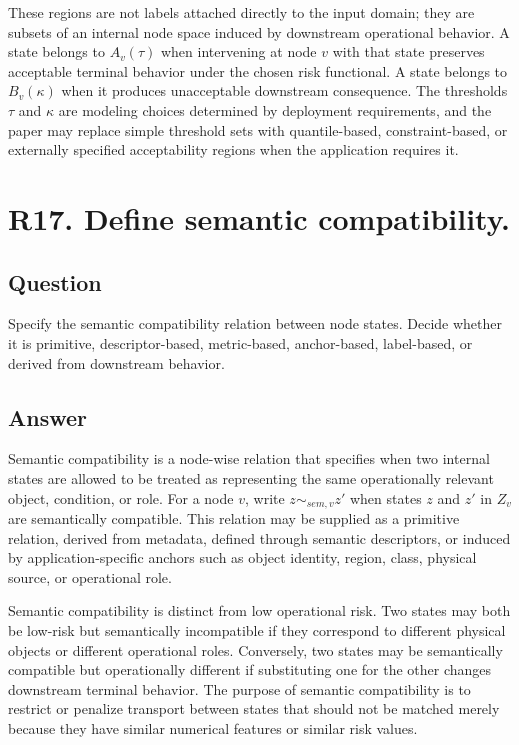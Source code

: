 \documentclass[11pt,a4paper]{article}
\begin{document}
These regions are not labels attached directly to the input domain; they are subsets of an internal node space induced by downstream operational behavior. A state belongs to \(A_v(\tau)\) when intervening at node \(v\) with that state preserves acceptable terminal behavior under the chosen risk functional. A state belongs to \(B_v(\kappa)\) when it produces unacceptable downstream consequence. The thresholds \(\tau\) and \(\kappa\) are modeling choices determined by deployment requirements, and the paper may replace simple threshold sets with quantile-based, constraint-based, or externally specified acceptability regions when the application requires it.

\section*{R17. Define semantic compatibility.}

\subsection*{Question}

Specify the semantic compatibility relation between node states. Decide whether it is primitive, descriptor-based, metric-based, anchor-based, label-based, or derived from downstream behavior.

\subsection*{Answer}

Semantic compatibility is a node-wise relation that specifies when two internal states are allowed to be treated as representing the same operationally relevant object, condition, or role. For a node \(v\), write \(z \sim_{sem,v} z'\) when states \(z\) and \(z'\) in \(Z_v\) are semantically compatible. This relation may be supplied as a primitive relation, derived from metadata, defined through semantic descriptors, or induced by application-specific anchors such as object identity, region, class, physical source, or operational role.

Semantic compatibility is distinct from low operational risk. Two states may both be low-risk but semantically incompatible if they correspond to different physical objects or different operational roles. Conversely, two states may be semantically compatible but operationally different if substituting one for the other changes downstream terminal behavior. The purpose of semantic compatibility is to restrict or penalize transport between states that should not be matched merely because they have similar numerical features or similar risk values.
\end{document}

